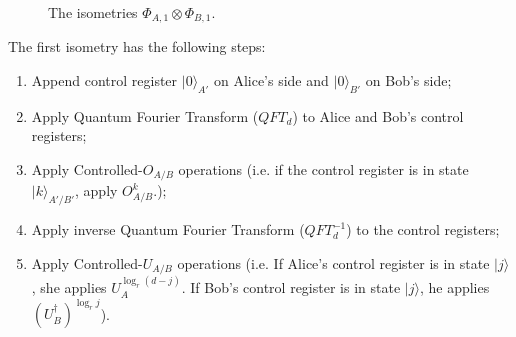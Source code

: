 \documentclass[11pt,letterpaper]{article}
\newcommand{\ket}[1]{|#1\rangle}
\newcommand{\x}{\otimes}
\newcommand{\ct}{^{\dagger}}
\newcommand{\1}{\mathbb{1}}
\theoremstyle{definition}
\begin{document}
\begin{figure}[H]
	\caption{The isometries $\Phi_{A,1} \x \Phi_{B,1}$.}
\end{figure}

The first isometry has the following steps:
\begin{enumerate}
	\item Append control register $\ket{0}_{A'}$ on Alice's side and $\ket{0}_{B'}$ on Bob's side;
	\item Apply Quantum Fourier Transform ($QFT_d$) to Alice and Bob's control registers;
	\item Apply Controlled-$O_{A/B}$ operations (i.e. if the control register is in state $\ket{k}_{A'/ B'}$, apply
	$O_{A/B}^k$.);
	\item Apply inverse Quantum Fourier Transform ($QFT_d^{-1}$) to the control registers;
	\item Apply Controlled-$U_{A/B}$ operations (i.e. If Alice's control register is in state $\ket{j}$, she applies
	$U_A^{\log_r (d-j)}$. If Bob's control register is in state $\ket{j}$, he applies $(U_B\ct)^{\log_r j}$).
\end{enumerate}
\end{document}
